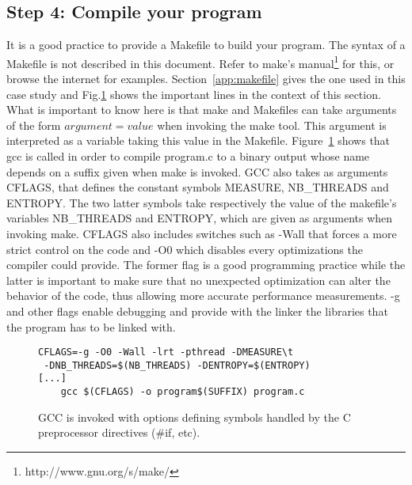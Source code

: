 \subsection{Step 4: Compile your program}
\label{sec:compile}
It is a good practice to provide a Makefile to build your program. The syntax of a Makefile is not described in this document. Refer to make's manual\footnote{http://www.gnu.org/s/make/} for this, or browse the internet for examples. Section~\ref{app:makefile} gives the one used in this case study and Fig.\ref{fig:makefile} shows the important lines in the context of this section. What is important to know here is that make and Makefiles can take arguments of the form $argument=value$ when invoking the make tool. This argument is interpreted as a variable taking this value in the Makefile. Figure~\ref{fig:makefile} shows that gcc is called in order to compile program.c to a binary output whose name depends on a suffix given when make is invoked. GCC also takes as arguments {CFLAGS}, that defines the constant symbols {MEASURE}, {NB\_THREADS} and {ENTROPY}. The two latter symbols take respectively the value of the makefile's variables {NB\_THREADS} and {ENTROPY}, which are given as arguments when invoking make. {CFLAGS} also includes switches such as {-Wall} that forces a more strict control on the code and {-O0} which disables every optimizations the compiler could provide. The former flag is a good programming practice while the latter is important to make sure that no unexpected optimization can alter the behavior of the code, thus allowing more accurate performance measurements. {-g} and other flags enable debugging and provide with the linker the libraries that the program has to be linked with.

\begin{figure}
\centering
\begin{lstlisting}
CFLAGS=-g -O0 -Wall -lrt -pthread -DMEASURE\t
 -DNB_THREADS=$(NB_THREADS) -DENTROPY=$(ENTROPY)
[...]
	gcc $(CFLAGS) -o program$(SUFFIX) program.c
\end{lstlisting}
\caption{GCC is invoked with options defining symbols handled by the {C} preprocessor directives (\#if, etc).}
\label{fig:makefile}
\end{figure}

